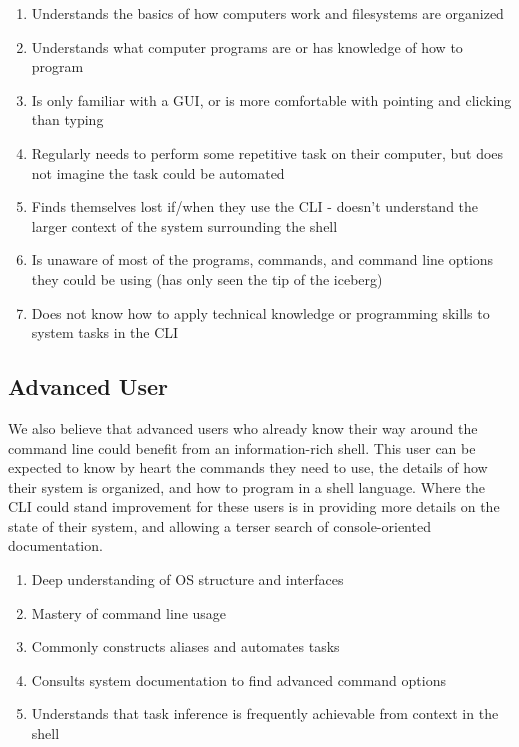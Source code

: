 \begin{enumerate}
\item Understands the basics of how computers work and filesystems are organized
\item Understands what computer programs are or has knowledge of how to program
\item Is only familiar with a GUI, or is more comfortable with pointing and clicking than typing
\item Regularly needs to perform some repetitive task on their computer, but does not imagine the task could be automated
\item Finds themselves lost if/when they use the CLI - doesn’t understand the larger context of the system surrounding the shell
\item Is unaware of most of the programs, commands, and command line options they could be using (has only seen the tip of the iceberg)
\item Does not know how to apply technical knowledge or programming skills to system tasks in the CLI
\end{enumerate}
\subsection{Advanced User}
We also believe that advanced users who already know their way around the
command line could benefit from an information-rich shell. This user can be
expected to know by heart the commands they need to use, the details of how
their system is organized, and how to program in a shell language. Where the CLI
could stand improvement for these users is in providing more details on the
state of their system, and allowing a terser search of console-oriented
documentation.

\begin{enumerate}
\item Deep understanding of OS structure and interfaces
\item Mastery of command line usage
\item Commonly constructs aliases and automates tasks
\item Consults system documentation to find advanced command options
\item Understands that task inference is frequently achievable from context in the shell
\end{enumerate}
